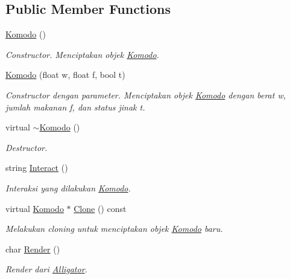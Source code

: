 \subsection*{Public Member Functions}
\begin{DoxyCompactItemize}
\item 
\hyperlink{classKomodo_a663a1a18bc7ac367f1a55a385604258d}{Komodo} ()
\begin{DoxyCompactList}\small\item\em Constructor. Menciptakan objek \hyperlink{classKomodo}{Komodo}. \end{DoxyCompactList}\item 
\hyperlink{classKomodo_ad98e389b1661efeeba847133e64c02e6}{Komodo} (float w, float f, bool t)
\begin{DoxyCompactList}\small\item\em Constructor dengan parameter. Menciptakan objek \hyperlink{classKomodo}{Komodo} dengan berat w, jumlah makanan f, dan status jinak t. \end{DoxyCompactList}\item 
virtual \hyperlink{classKomodo_a16e327cbffe1088c1f04c397c1fbc6dd}{$\sim$\+Komodo} ()
\begin{DoxyCompactList}\small\item\em Destructor. \end{DoxyCompactList}\item 
string \hyperlink{classKomodo_a250e6b06c369a94faaa551751cd09196}{Interact} ()
\begin{DoxyCompactList}\small\item\em Interaksi yang dilakukan \hyperlink{classKomodo}{Komodo}. \end{DoxyCompactList}\item 
virtual \hyperlink{classKomodo}{Komodo} $\ast$ \hyperlink{classKomodo_aab3bd7ee8235c87e8bbafd8848968be8}{Clone} () const 
\begin{DoxyCompactList}\small\item\em Melakukan cloning untuk menciptakan objek \hyperlink{classKomodo}{Komodo} baru. \end{DoxyCompactList}\item 
char \hyperlink{classKomodo_a06ce8ed3d58a33968ecf4a12a3ebbd4d}{Render} ()
\begin{DoxyCompactList}\small\item\em Render dari \hyperlink{classAlligator}{Alligator}. \end{DoxyCompactList}\end{DoxyCompactItemize}
